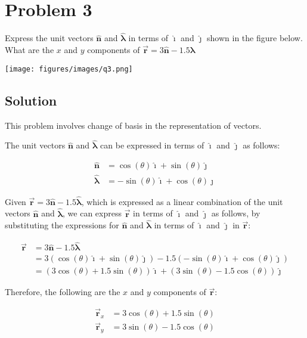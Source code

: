 \section*{Problem 3}

Express the unit vectors \( \mathbf{\hat{n}} \) and \( \mathbf{\hat{\lambda}} \) in terms of \( \mathbf{\hat{\imath}} \) and \( \mathbf{\hat{\jmath}} \) shown in the figure below.
What are the \( x \) and \( y \) components of \( \vec{\mathbf{r}} = 3\mathbf{\hat{n}} - 1.5\mathbf{\hat{\lambda}} \)

\begin{figure*}[h]
    \centering
    \texttt{[image: figures/images/q3.png]}
\end{figure*}

\subsection*{Solution}

This problem involves change of basis in the representation of vectors.

The unit vectors \( \mathbf{\hat{n}} \) and \( \mathbf{\hat{\lambda}} \) can be expressed in terms of \( \mathbf{\hat{\imath}} \) and \( \mathbf{\hat{\jmath}} \) as follows:

\[
    \boxed{
        \begin{aligned}
            \mathbf{\hat{n}}       & = \cos(\theta) \mathbf{\hat{\imath}}  + \sin(\theta) \mathbf{\hat{\jmath}} \\
            \mathbf{\hat{\lambda}} & = -\sin(\theta) \mathbf{\hat{\imath}} + \cos(\theta) \mathbf{\hat{\jmath}}
        \end{aligned}
    }
\]

Given \( \vec{\mathbf{r}} = 3\mathbf{\hat{n}} - 1.5\mathbf{\hat{\lambda}} \), which is expressed as a linear combination of the unit vectors \( \mathbf{\hat{n}} \) and \( \mathbf{\hat{\lambda}} \), we can express \( \vec{\mathbf{r}} \) in terms of \( \mathbf{\hat{\imath}} \) and \( \mathbf{\hat{\jmath}} \) as follows, by substituting the expressions for \( \mathbf{\hat{n}} \) and \( \mathbf{\hat{\lambda}} \) in terms of \( \mathbf{\hat{\imath}} \) and \( \mathbf{\hat{\jmath}} \) in \( \vec{\mathbf{r}} \):

\[
    \begin{aligned}
        \vec{\mathbf{r}} & = 3\mathbf{\hat{n}} - 1.5\mathbf{\hat{\lambda}}                                                                                                              \\
                         & = 3(\cos(\theta) \mathbf{\hat{\imath}} + \sin(\theta) \mathbf{\hat{\jmath}}) - 1.5(-\sin(\theta) \mathbf{\hat{\imath}} + \cos(\theta) \mathbf{\hat{\jmath}}) \\
                         & = (3\cos(\theta) + 1.5\sin(\theta))\mathbf{\hat{\imath}} + (3\sin(\theta) - 1.5\cos(\theta))\mathbf{\hat{\jmath}}
    \end{aligned}
\]

Therefore, the following are the \( x \) and \( y \) components of \( \vec{\mathbf{r}} \):

\[
    \boxed{
        \begin{aligned}
            \vec{\mathbf{r}}_x & = 3\cos(\theta) + 1.5\sin(\theta) \\
            \vec{\mathbf{r}}_y & = 3\sin(\theta) - 1.5\cos(\theta)
        \end{aligned}
    }
\]
